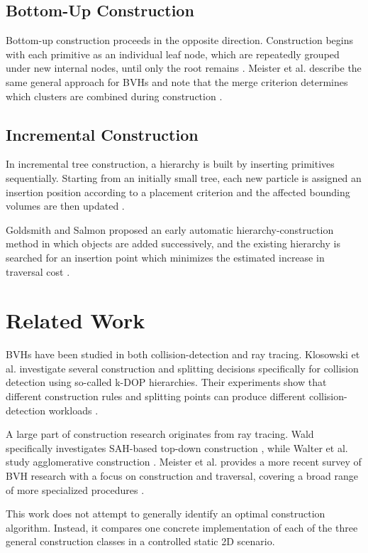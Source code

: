 \subsection{Bottom-Up Construction}

Bottom-up construction proceeds in the opposite direction. 
Construction begins with each primitive as an individual leaf node, which are repeatedly grouped under new internal nodes, until only the root remains \cite[pp.~245--250]{ericson2004real}.
Meister et al. describe the same general approach for BVHs and note that the merge criterion determines which clusters are combined during construction \cite[p.~687]{meister2021survey}.

\subsection{Incremental Construction}

In incremental tree construction, a hierarchy is built by inserting primitives sequentially. 
Starting from an initially small tree, each new particle is assigned an insertion position according to a placement criterion and the affected bounding volumes are then updated \cite[pp.~251--252]{ericson2004real}.

Goldsmith and Salmon proposed an early automatic hierarchy-construction method in which objects are added successively, and the existing hierarchy is searched for an insertion point which minimizes the estimated increase in traversal cost \cite[pp.~16--17]{goldsmith1987automatic}.



\section{Related Work} 

BVHs have been studied in both collision-detection and ray tracing.
Klosowski et al. investigate several construction and splitting decisions specifically for collision detection using so-called k-DOP hierarchies.
Their experiments show that different construction rules and splitting points can produce different collision-detection workloads \cite{klosowski1998kdops}.

A large part of construction research originates from ray tracing.
Wald specifically investigates SAH-based top-down construction \cite{wald2007sah}, while Walter et al. study agglomerative construction \cite{walter2008agglomerative}.
Meister et al. provides a more recent survey of BVH research with a focus on construction and traversal, covering a broad range of more specialized procedures \cite{meister2021survey}.

This work does not attempt to generally identify an optimal construction algorithm. 
Instead, it compares one concrete implementation of each of the three general construction classes in a controlled static 2D scenario.

\newpage